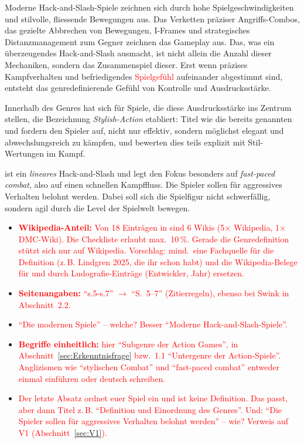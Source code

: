 \documentclass[../Main.tex]{subfiles}
\begin{document}
Moderne Hack-and-Slash-Spiele zeichnen sich durch hohe Spielgeschwindigkeiten und stilvolle, fliessende Bewegungen aus. Das Verketten präziser Angriffs-Combos, das gezielte Abbrechen von Bewegungen, I-Frames und strategisches Distanzmanagement zum Gegner zeichnen das Gameplay aus. Das, was ein überzeugendes Hack-and-Slash ausmacht, ist nicht allein die Anzahl dieser Mechaniken, sondern das Zusammenspiel dieser. Erst wenn präzises Kampfverhalten und befriedigendes \textcolor{red}{Spielgefühl} aufeinander abgestimmt sind, entsteht das genredefinierende Gefühl von Kontrolle und Ausdrucksstärke.\autocite[s.5-s.7]{lindgren2025striking}

Innerhalb des Genres hat sich für Spiele, die diese Ausdrucksstärke ins Zentrum stellen, die Bezeichnung \textit{Stylish-Action} etabliert: Titel wie die bereits genannten  und  fordern den Spieler auf, nicht nur effektiv, sondern möglichst elegant und abwechslungsreich zu kämpfen, und bewerten dies teils explizit mit Stil-Wertungen im Kampf.

 ist ein \textit{lineares} Hack-and-Slash und legt den Fokus besonders auf \textit{fast-paced combat}, also auf einen schnellen Kampffluss. Die Spieler sollen für aggressives Verhalten belohnt werden. Dabei soll sich die Spielfigur nicht schwerfällig, sondern agil durch die Level der Spielwelt bewegen.

\begin{itemize}[leftmargin=1.5cm]
    \item \textcolor{red}{\textbf{Wikipedia-Anteil:} Von 18 Einträgen in  sind 6 Wikis (5$\times$ Wikipedia, 1$\times$ DMC-Wiki). Die Checkliste erlaubt max.\ 10\,\%. Gerade die Genredefinition stützt sich nur auf Wikipedia. Vorschlag: mind.\ eine Fachquelle für die Definition (z.\,B. Lindgren 2025, die ihr schon habt) und die Wikipedia-Belege für  und  durch Ludografie-Einträge (Entwickler, Jahr) ersetzen.}
    \item \textcolor{red}{\textbf{Seitenangaben:} \enquote{s.5-s.7} $\rightarrow$ \enquote{S.~5--7} (Zitierregeln), ebenso bei Swink in Abschnitt~2.2.}
    \item \textcolor{red}{\enquote{Die modernen Spiele} -- welche? Besser \enquote{Moderne Hack-and-Slash-Spiele}.}
    \item \textcolor{red}{\textbf{Begriffe einheitlich:} hier \enquote{Subgenre der Action Games}, in Abschnitt~\ref{sec:Erkenntnisfrage} bzw.\ 1.1 \enquote{Untergenre der Action-Spiele}. Anglizismen wie \enquote{stylischen Combat} und \enquote{fast-paced combat} entweder einmal einführen oder deutsch schreiben.}
    \item \textcolor{red}{Der letzte Absatz ordnet euer Spiel ein und ist keine Definition. Das passt, aber dann Titel z.\,B. \enquote{Definition und Einordnung des Genres}. Und: \enquote{Die Spieler sollen für aggressives Verhalten belohnt werden} -- wie? Verweis auf V1 (Abschnitt~\ref{sec:V1}).}
\end{itemize}
\end{document}
